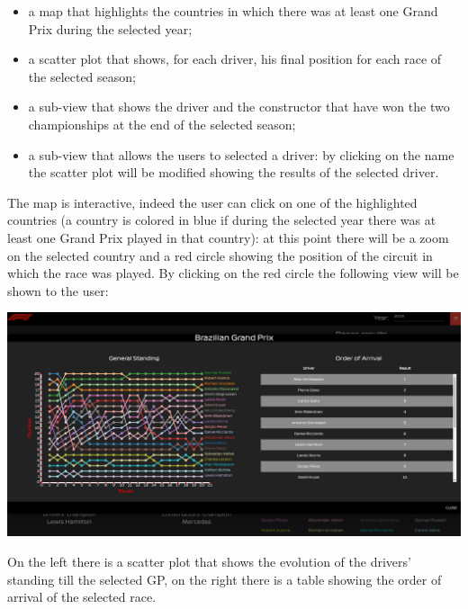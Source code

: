 \documentclass[10pt,twocolumn,letterpaper]{article}
\begin{document}
\begin{itemize}
	\item a map that highlights the countries in which there was at least one Grand Prix during the selected year;
	\item a scatter plot that shows, for each driver, his final position for each race of the selected season;
	\item a sub-view that shows the driver and the constructor that have won the two championships at the end of the selected season;
	\item a sub-view that allows the users to selected a driver: by clicking on the name the scatter plot will be modified showing the results of the selected driver.
\end{itemize}

The map is interactive, indeed the user can click on one of the highlighted countries (a country is colored in blue if during the selected year there was at least one Grand Prix
played in that country): at this point there will be a zoom on the selected country and a red circle showing the position of the circuit in which the race was played. By clicking
on the red circle the following view will be shown to the user:

\begin{center}
	\centering
	\includegraphics[width=\columnwidth]{map-clicked}
\end{center}

On the left there is a scatter plot that shows the evolution of the drivers' standing till the selected GP, on the right there is a table showing the order of arrival of the selected
race.
\end{document}
